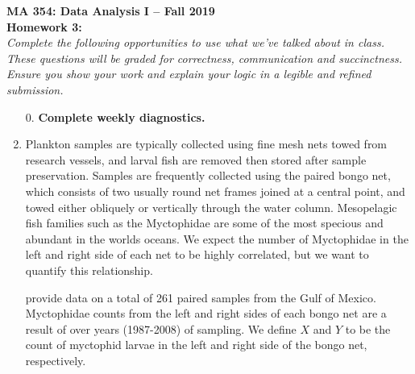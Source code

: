 \documentclass{article}
\begin{document}

\noindent \textbf{MA 354: Data Analysis I -- Fall 2019}\\%
\noindent \textbf{Homework 3:}\vspace{1em}\\
\emph{Complete the following opportunities to use what we've talked about in class. 
These questions will be graded for correctness, communication and succinctness. Ensure
you show your work and explain your logic in a legible and refined submission.}\\

\begin{enumerate}
\item[0.] \textbf{Complete weekly diagnostics.}

\item  	Plankton samples are typically collected using fine mesh nets towed from research vessels, and larval fish are removed then stored after sample preservation. Samples are frequently collected using the paired bongo net, which consists of two usually round net frames joined at a central point, and towed either obliquely or vertically through the water column. Mesopelagic fish families such as the Myctophidae are some of the most specious and abundant in the worlds oceans. We expect the number of Myctophidae in the left and right side of each net to be highly correlated, but we want to quantify this relationship. 
	
	\cite{Muhling} provide data on a total of 261 paired samples from the Gulf of Mexico. Myctophidae counts from the left and right sides of each bongo net are a result of over years (1987-2008) of sampling. We define $X$ and $Y$ to be the count of myctophid larvae in the left and right side of the bongo net, respectively.
	

\end{enumerate}
\end{document}
